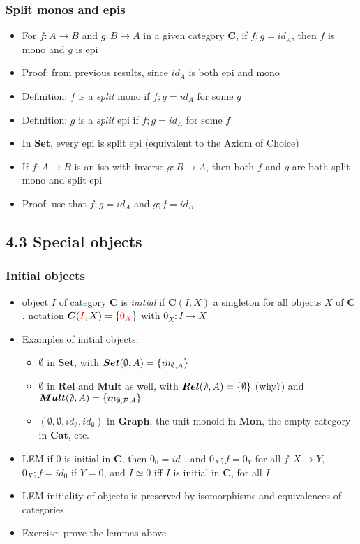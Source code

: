 \documentclass[handout]{beamer}
\newcommand{\bfsf}[1]{{\boldsymbol{#1}}}
\newcommand{\Set}{\bfsf{Set}}
\newcommand{\Gra}{\bfsf{Graph}}
\newcommand{\CC}{\bfsf{C}}
\newcommand{\Rel}{\bfsf{Rel}}
\newcommand{\Mult}{\bfsf{Mult}}
\newcommand{\Mon}{\bfsf{Mon}}
\newcommand{\Cat}{\bfsf{Cat}}
\begin{document}
\frame
  {   
    \frametitle{Split monos and epis}\label{Ch4:SplitMonEp}

 \begin{itemize}[<+->]
\item For $f:A\to B$ and $g:B\to A$ in a given category $\CC$,
if $f;g=id_A$, then $f$ is mono and $g$ is epi
\item Proof: from previous results, since $id_A$ is both epi and mono
\item Definition: $f$ is a \emph{split} mono if $f;g=id_A$ for some $g$
\item Definition: $g$ is a \emph{split} epi if $f;g=id_A$ for some $f$
\item In $\Set$, every epi is split epi (equivalent to the Axiom of Choice)
\item If $f:A\to B$ is an iso with inverse $g:B\to A$, then both $f$ and $g$ are
both split mono and split epi
\item Proof: use that $f;g = id_A$  and $g;f = id_B$
 \end{itemize}

 }


\subsection{4.3 Special objects}
 
\frame
  {   
    \frametitle{Initial objects}\label{Ch4:InitialObj}

 \begin{itemize}[<+->]
\item object $I$ of category $\CC$ is \emph{initial}  
if $\CC(I,X)$ a singleton for all objects $X$ of $\CC$, 
notation $\CC({\color{red}I},X)=\set{{\color{red}0_X}}$ with $0_X: I\to X$
\item Examples of initial objects: 
 \begin{itemize}
\item $\emptyset$ in $\Set$, 
with $\Set(\emptyset,A)=\set{in_{\emptyset,A}}$ %
\item $\emptyset$ in $\Rel$ and $\Mult$ as well, 
with $\Rel(\emptyset,A) = \set{\emptyset} $ (why?) 
and $ \Mult(\emptyset,A) = \set{in_{\emptyset,\powset A}}$
\item$(\emptyset,\emptyset,id_{\emptyset},id_{\emptyset})$
in $\Gra$, the unit monoid in $\Mon$, the empty category in $\Cat$, etc.
 \end{itemize} 
\item LEM if $0$ is initial in $\CC$, then $0_0 = id_0$, and $0_X;f = 0_Y$ for 
all $f: X\to Y$, $0_X;f = id_0$ if $Y=0$,
and $I\simeq 0$ iff $I$ is
initial in $\CC$, for all $I$
\item LEM initiality of objects is preserved by isomorphisms and
equivalences of categories
\item Exercise: prove the lemmas above
\end{itemize}

 }
\end{document}
